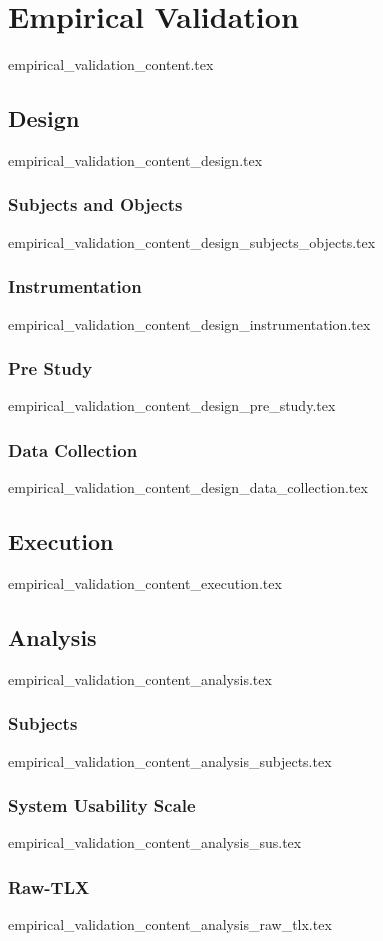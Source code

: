 \chapter{Empirical Validation}
  {empirical_validation_content.tex}

\section{Design}\label{sub:design}
  {empirical_validation_content_design.tex}

\subsection{Subjects and Objects}\label{sub:subjects_objects}
  {empirical_validation_content_design_subjects_objects.tex}

\subsection{Instrumentation}\label{sub:instrumentation}
  {empirical_validation_content_design_instrumentation.tex}

\subsection{Pre Study}\label{sub:pre_study}
  {empirical_validation_content_design_pre_study.tex}

\subsection{Data Collection}
  {empirical_validation_content_design_data_collection.tex}

\section{Execution}\label{sub:execution}
  {empirical_validation_content_execution.tex}

\section{Analysis}\label{sub:analysis}
  {empirical_validation_content_analysis.tex}

\subsection{Subjects}
  {empirical_validation_content_analysis_subjects.tex}

\subsection{System Usability Scale}\label{sub:sus}
  {empirical_validation_content_analysis_sus.tex}

\subsection{Raw-TLX}\label{sub:raw-tlx}
  {empirical_validation_content_analysis_raw_tlx.tex}
